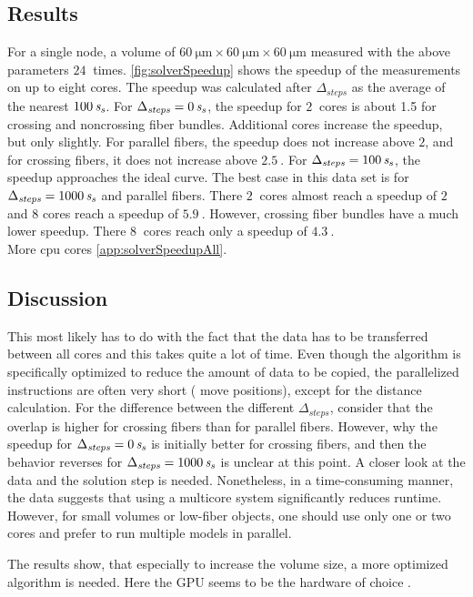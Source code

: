 \subsection{Results}
For a single node, a volume of $\SI{60}{\micro\meter} \times \SI{60}{\micro\meter} \times \SI{60}{\micro\meter}$ measured with the above parameters $\SI{24}{}$ times.
\cref{fig:solverSpeedup} shows the speedup of the measurements on up to eight cores.
The speedup was calculated after $\Delta_{\mathit{steps}}$ as the average of the nearest $\SI{100}{\textnormal{$\mathit{s_{s}}$}}$.
For $\Delta_{\mathit{steps}} = \SI{0}{\textnormal{$\mathit{s_{s}}$}}$, the speedup for $\SI{2}{}$ cores is about 1.5 for crossing and noncrossing fiber bundles.
Additional cores increase the speedup, but only slightly.
For parallel fibers, the speedup does not increase above $2$, and for crossing fibers, it does not increase above $\SI{2.5}{}$.
For $\Delta_{\mathit{steps}} = \SI{100}{\textnormal{$\mathit{s_{s}}$}}$, the speedup approaches the ideal curve.
The best case in this data set is for $\Delta_{\mathit{steps}} = \SI{1000}{\textnormal{$\mathit{s_{s}}$}}$ and parallel fibers. There $\SI{2}{}$ cores almost reach a speedup of $2$ and 8 cores reach a speedup of $\SI{5.9}{}$.
However, crossing fiber bundles have a much lower speedup.
There $\SI{8}{}$ cores reach only a speedup of $\SI{4.3}{}$.
\\
\dummy{} More cpu cores \cref{app:solverSpeedupAll}.
% 
\subsection{Discussion}
This most likely has to do with the fact that the data has to be transferred between all cores and this takes quite a lot of time.
Even though the algorithm is specifically optimized to reduce the amount of data to be copied, the parallelized instructions are often very short (\eg{} move positions), except for the distance calculation.
For the difference between the different $\Delta_{\mathit{steps}}$, consider that the overlap is higher for crossing fibers than for parallel fibers.
However, why the speedup for $\Delta_{\mathit{steps}}=\SI{0}{\textnormal{$\mathit{s_{s}}$}}$ is initially better for crossing fibers, and then the behavior reverses for $\Delta_{\mathit{steps}}=\SI{1000}{\textnormal{$\mathit{s_{s}}$}}$ is unclear at this point. 
A closer look at the data and the solution step is needed.
Nonetheless, in a time-consuming manner, the data suggests that using a multicore system significantly reduces runtime.
However, for small volumes or low-fiber objects, one should use only one or two cores and prefer to run multiple models in parallel.
\par
% 
The results show, that especially to increase the volume size, a more optimized algorithm is needed.
Here the \ac{GPU} seems to be the hardware of choice \cite{Karras2012}.
% 
% 
% 
